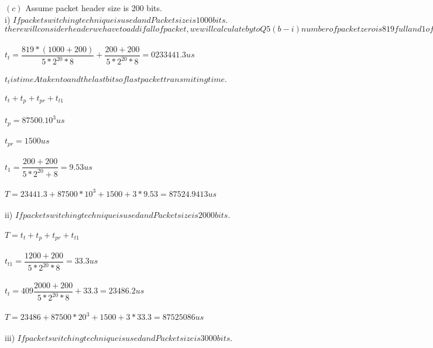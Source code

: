 \documentclass[a4paper,12pt]{article}
\begin{document}
$ (c) $ Assume packet header size is 200 bits.\\
i) $ If packet switching technique is used and Packet size is 1000 bits.$\\
$ there will consider header we have to add if all of packet,we will calculate by to Q5(b-i)number of packet zero is 819 full and 1 of 200bits  $\\\\

$ t_{t}=\dfrac{819*(1000+200)}{5*2^{20}*8}+\dfrac{200+200}{5*2^{20}*8}=0233441.3 us $\\\\
$ t_{t}is time A taken to and the last bits of last packet transmiting time.$\\\\
$ t_{t}+t_{p}+t_{pr}+t_{t1}$\\\\
$ t_{p}=87500.10^{3} us$\\\\
$ t_{pr}=1500 us $\\\\
$ t_{1}=\dfrac{200+200}{5*2^{20}+8}=9.53 us $\\\\
$ T = 23441.3+87500*10^{3}+1500+3*9.53=87524.9413 us $\\\\

ii) $ If packet switching technique is used and Packet size is 2000 bits.$\\\\
$ T = t_{t}+t_{p}+t_{pr}+t_{t1}$\\\\
$ t_{t1}=\dfrac{1200+200}{5*2^{20}*8}=33.3 us $\\\\
$ t_{t}=409\dfrac{2000+200}{5*2^{20}*8}+33.3=23486.2 us $\\\\
$ T = 23486+87500*20^{3}+1500+3*33.3=87525086 us $\\\\

iii) $ If packet switching technique is used and Packet size is 3000 bits.$\\\\
\end{document}
